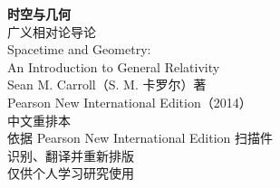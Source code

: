 \documentclass[11pt,a4paper,twoside,openright]{ctexbook}
\begin{document}
\frontmatter
\begin{titlepage}
\centering
{\Huge\bfseries 时空与几何\\[1.2em]}
{\LARGE 广义相对论导论\\[5em]}
{\Large Spacetime and Geometry:\\
An Introduction to General Relativity\\[3em]}
{\Large Sean M. Carroll（S. M. 卡罗尔）\quad 著\\[1em]}
{\large Pearson New International Edition（2014）\\[5em]}
{\large 中文重排本\\[0.5em]}
{\large 依据 Pearson New International Edition 扫描件\\[0.3em]
识别、翻译并重新排版\\[0.3em]
仅供个人学习研究使用\\[3em]}
\end{titlepage}
\thispagestyle{empty}\mbox{}\clearpage
\frontmatter

\tableofcontents

\mainmatter











\appendix



\end{document}
